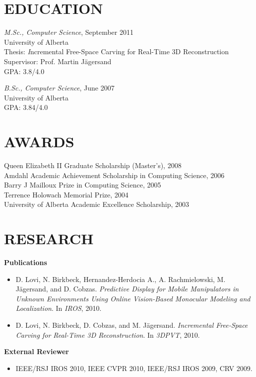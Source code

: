 \documentclass{res}
\begin{document}
\begin{resume}
\section{EDUCATION}
    \vspace*{0.5ex}
    \textit{M.Sc., Computer Science}, September 2011\\
    University of Alberta\\
    \hspace*{2.5em} Thesis: {\textit Incremental Free-Space Carving for Real-Time 3D Reconstruction}\\
    \hspace*{2.5em} Supervisor: Prof. Martin J{\"a}gersand\\
    \hspace*{2.5em} GPA: 3.8/4.0

    \textit{B.Sc., Computer Science}, June 2007\\
    University of Alberta\\
    \hspace*{2.5em} GPA: 3.84/4.0


\section{AWARDS}
    \vspace*{0.5ex}
    Queen Elizabeth II Graduate Scholarship (Master's), 2008\\
    Amdahl Academic Achievement Scholarship in Computing Science, 2006\\
    Barry J Mailloux Prize in Computing Science, 2005\\
    Terrence Holowach Memorial Prize, 2004\\
    University of Alberta Academic Excellence Scholarship, 2003


\section{RESEARCH}
    \vspace*{0.75ex}
    \textbf{Publications}\vspace*{0.666ex}
    \begin{itemize}[label={}, labelsep=*, leftmargin=2.8em]
        \item D. Lovi, N. Birkbeck, Hernandez-Herdocia A., A. Rachmielowski, M. J{\"a}gersand, and D. \hspace*{1.5em}Cobzas.  \textit{Predictive Display for Mobile Manipulators in Unknown Environments Using \hspace*{1.5em}Online Vision-Based Monocular Modeling and Localization}. In \textit{IROS}, 2010.
        \item D. Lovi, N. Birkbeck, D. Cobzas, and M. J{\"a}gersand. \textit{Incremental Free-Space Carving for \hspace*{1.5em}Real-Time 3D Reconstruction}. In \textit{3DPVT}, 2010.
    \end{itemize}
    \textbf{External Reviewer}
    \begin{itemize}[label={}, labelsep=*, leftmargin=2.8em]
    \item IEEE/RSJ IROS 2010, IEEE CVPR 2010, IEEE/RSJ IROS 2009, CRV 2009.
    \end{itemize}


\end{resume}
\end{document}
